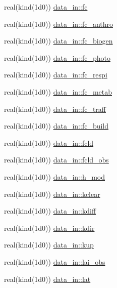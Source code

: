 \begin{DoxyCompactItemize}
\item 
real(kind(1d0)) \hyperlink{namespacedata__in_a8bc526d8d9a75c1ecef04817aac48046}{data\+\_\+in\+::fc}
\item 
real(kind(1d0)) \hyperlink{namespacedata__in_ad77982daffd6bf19ea51d6635d9d2009}{data\+\_\+in\+::fc\+\_\+anthro}
\item 
real(kind(1d0)) \hyperlink{namespacedata__in_a446b6dc73d9c2e2518917361d9b526b3}{data\+\_\+in\+::fc\+\_\+biogen}
\item 
real(kind(1d0)) \hyperlink{namespacedata__in_a39642f3fc927b3a4394dda8fef2c193b}{data\+\_\+in\+::fc\+\_\+photo}
\item 
real(kind(1d0)) \hyperlink{namespacedata__in_a5d6aae5bf11940a5ff7437dfec30cd4f}{data\+\_\+in\+::fc\+\_\+respi}
\item 
real(kind(1d0)) \hyperlink{namespacedata__in_a8676790950975f07daf8d24b503ef952}{data\+\_\+in\+::fc\+\_\+metab}
\item 
real(kind(1d0)) \hyperlink{namespacedata__in_a9fcca4951f8282ad10df290f8a025387}{data\+\_\+in\+::fc\+\_\+traff}
\item 
real(kind(1d0)) \hyperlink{namespacedata__in_a3c13cce56632f598e61b00bccdc94e4a}{data\+\_\+in\+::fc\+\_\+build}
\item 
real(kind(1d0)) \hyperlink{namespacedata__in_a8afa15b03c067e57c570544bd5562ac1}{data\+\_\+in\+::fcld}
\item 
real(kind(1d0)) \hyperlink{namespacedata__in_a03109ad2e583af2eb4b59e2e95758a72}{data\+\_\+in\+::fcld\+\_\+obs}
\item 
real(kind(1d0)) \hyperlink{namespacedata__in_aaa77ae828595f5b1e1bec4237020dfbc}{data\+\_\+in\+::h\+\_\+mod}
\item 
real(kind(1d0)) \hyperlink{namespacedata__in_ab31fbd3fd9d4036fa930706c4de36397}{data\+\_\+in\+::kclear}
\item 
real(kind(1d0)) \hyperlink{namespacedata__in_ab7baf80fc15ebb7a7b739d064226a548}{data\+\_\+in\+::kdiff}
\item 
real(kind(1d0)) \hyperlink{namespacedata__in_a4e6bf95c9d5bb3ea152dc358ac818008}{data\+\_\+in\+::kdir}
\item 
real(kind(1d0)) \hyperlink{namespacedata__in_a5d9f4f79563d2e000333219a4d2f4c99}{data\+\_\+in\+::kup}
\item 
real(kind(1d0)) \hyperlink{namespacedata__in_af9683d39e50e85ff167afd46236c7643}{data\+\_\+in\+::lai\+\_\+obs}
\item 
real(kind(1d0)) \hyperlink{namespacedata__in_a364ff1ce2a4c78ea431e4dacbd66d6b4}{data\+\_\+in\+::lat}

\end{DoxyCompactItemize}

